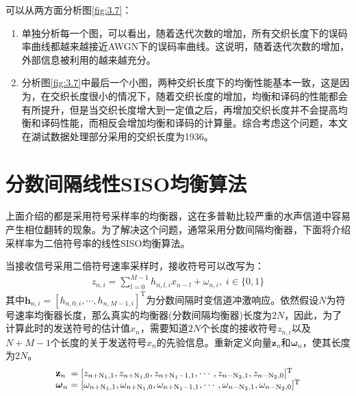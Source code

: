 可以从两方面分析图\ref{fig:3.7}：
\begin{enumerate}
    \item
        单独分析每一个图，可以看出，随着迭代次数的增加，所有交织长度下的误码率曲线都越来越接近AWGN下的误码率曲线。这说明，随着迭代次数的增加，外部信息被利用的越来越充分。
    \item
        分析图\ref{fig:3.7}中最后一个小图，两种交织长度下的均衡性能基本一致，这是因为，在交织长度很小的情况下，随着交织长度的增加，均衡和译码的性能都会有所提升，但是当交织长度增大到一定值之后，再增加交织长度并不会提高均衡和译码性能，而相反会增加均衡和译码的计算量。综合考虑这个问题，本文在湖试数据处理部分采用的交织长度为1936。
\end{enumerate}

\section{分数间隔线性SISO均衡算法}
上面介绍的都是采用符号采样率的均衡器，这在多普勒比较严重的水声信道中容易产生相位翻转的现象。为了解决这个问题，通常采用分数间隔均衡器，下面将介绍采样率为二倍符号率的线性SISO均衡算法。

当接收信号采用二倍符号速率采样时，接收符号可以改写为：
\begin{eqnarray}
    z_{n,i}=\sum_{l=0}^{M-1}h_{n,l,i}x_{n-l}+\omega_{n,i},\;i\in\{0,1\}
    \label{equ:3.38}
\end{eqnarray}
其中$\mathbf{h}_{n,i}=[h_{n,0,i},\cdots,h_{n,M-1,i}]^{\mathrm{T}}$为分数间隔时变信道冲激响应。依然假设$N$为符号速率均衡器长度，那么真实的均衡器(分数间隔均衡器)长度为$2N$，因此，为了计算此时的发送符号的估计值$\hat{x}_n$，需要知道$2N$个长度的接收符号$z_{n,i}$以及$N+M-1$个长度的关于发送符号$x_n$的先验信息。重新定义向量$\mathbf{z}_n$和$\boldsymbol{\omega}_n$，使其长度为$2N$。
\begin{eqnarray}
    \begin{array}{l@{\;=\;}l}
        \mathbf{z}_n&[z_{n+\mathrm{N}_1,1},z_{n+\mathrm{N}_1,0},z_{n+\mathrm{N}_1-1,1},\cdots,z_{n-\mathrm{N}_2,1},z_{n-\mathrm{N}_2,0}]^{\mathrm{T}}\\
        \boldsymbol{\omega}_n&[\omega_{n+\mathrm{N}_1,1},\omega_{n+\mathrm{N}_1,0},\omega_{n+\mathrm{N}_1-1,1},\cdots,\omega_{n-\mathrm{N}_2,1},\omega_{n-\mathrm{N}_2,0}]^{\mathrm{T}}
    \end{array}
    \label{equ:3.39}
\end{eqnarray}

